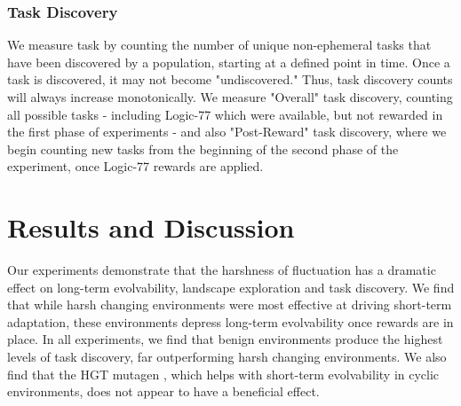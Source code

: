 \documentclass[PhD]{msu-thesis}
\begin{document}
\subsubsection{Task Discovery}
We measure task
by counting the number of unique non-ephemeral tasks that have been discovered by a population, starting at a defined point in time. Once a task is discovered, it may not become "undiscovered." Thus, task discovery counts will always increase monotonically. We measure "Overall" task discovery, counting all possible tasks - including Logic-77 
which were available, but not rewarded in the first phase of experiments - and also "Post-Reward" task discovery, where we begin counting new tasks from the beginning of the second phase of the experiment, once Logic-77 rewards are applied. 

\section{Results and Discussion}

Our experiments demonstrate that the harshness of fluctuation has a dramatic effect on long-term evolvability, landscape exploration and task discovery. We find that while harsh changing environments were most effective at driving short-term adaptation, these environments depress long-term evolvability once rewards are in place. In all experiments, we find that benign environments produce the highest levels of task discovery, far outperforming harsh changing environments. We also find that the HGT mutagen
, which helps with short-term evolvability in cyclic environments, does not appear to have a beneficial effect.
\end{document}
